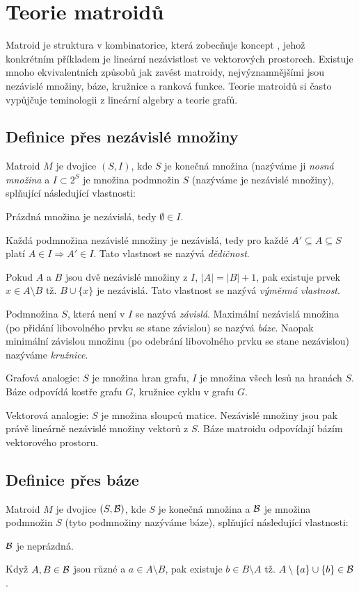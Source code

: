 \section{Teorie matroidů}

Matroid je struktura v kombinatorice, která zobecňuje koncept
, jehož konkrétním příkladem je lineární nezávistlost ve
vektorových prostorech. Existuje mnoho ekvivalentních způsobů jak zavést
matroidy, nejvýznamnějšími jsou nezávislé množiny, báze, kružnice a ranková
funkce. Teorie matroidů si často vypůjčuje teminologii z lineární algebry a
teorie grafů.

\subsection{Definice přes nezávislé množiny}
\df Matroid $M$ je dvojice $(S,I)$, kde $S$ je konečná množina (nazýváme ji
\emph{nosná množina} a $I \subset 2^S$ je množina podmnožin $S$ (nazýváme je
nezávislé množiny), splňující následující vlastnosti:
\begin{enumerate*}
\item Prázdná množina je nezávislá, tedy $\emptyset \in I$.
\item Každá podmnožina nezávislé množiny je nezávislá, tedy pro každé $A' \subseteq A \subseteq S$ platí $A \in I \Rightarrow A' \in I$. Tato vlastnost se nazývá \emph{dědičnost}.
\item Pokud $A$ a $B$ jsou dvě nezávislé množiny z $I$, $|A| = |B| + 1$, pak existuje prvek $x\in A\setminus B$ tž. $B\cup\{x\}$ je nezávislá. Tato vlastnost se nazývá \emph{výměnná vlastnost}.
\end{enumerate*}

\df Podmnožina $S$, která není v $I$ se nazývá \emph{závislá}. Maximální nezávislá
množina (po přidání libovolného prvku se stane závislou) se nazývá \emph{báze}.
Naopak minimální závislou množinu (po odebrání libovolného prvku se stane
nezávislou) nazýváme \emph{kružnice}.

\pzn Grafová analogie: $S$ je množina hran grafu, $I$ je množina všech lesů na
hranách $S$. Báze odpovídá kostře grafu $G$, kružnice cyklu v grafu $G$.

\pzn Vektorová analogie: $S$ je množina sloupců matice. Nezávislé množiny jsou
pak právě lineárně nezávislé množiny vektorů z $S$. Báze matroidu odpovídají
bázím vektorového prostoru.

\subsection{Definice přes báze}
\df Matroid $M$ je dvojice $(S,\mathcal{B})$, kde $S$ je konečná množina a $\mathcal{B}$ je
množina podmnožin $S$ (tyto podmnožiny nazýváme báze), splňující následující
vlastnosti:
\begin{enumerate*}
\item $\mathcal{B}$ je neprázdná.
\item Když $A,B \in \mathcal{B}$ jsou různé a $a \in A\setminus B$, pak existuje $b \in B\setminus A$ tž. $A\setminus\{a\}\cup\{b\} \in \mathcal{B}$.
\end{enumerate*}

